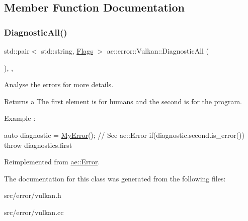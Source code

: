 \subsection{Member Function Documentation}
\hypertarget{classae_1_1error_1_1_vulkan_a1446494fd8ab1b5fc4b9ca8c27b37e8a}{}\label{classae_1_1error_1_1_vulkan_a1446494fd8ab1b5fc4b9ca8c27b37e8a} 
\subsubsection{\texorpdfstring{Diagnostic\+All()}{DiagnosticAll()}}
{\footnotesize\ttfamily std\+::pair$<$ std\+::string, \hyperlink{structae_1_1error_1_1_flags}{Flags} $>$ ae\+::error\+::\+Vulkan\+::\+Diagnostic\+All (\begin{DoxyParamCaption}{ }\end{DoxyParamCaption})\hspace{0.3cm}{\ttfamily [override]}, {\ttfamily [virtual]}, {\ttfamily [noexcept]}}



Analyse the errors for more details. 

\begin{DoxyReturn}{Returns}
a The first element is for humans and the second is for the program.
\end{DoxyReturn}
Example \+:


\begin{DoxyCode}
\textcolor{keyword}{auto} diagnostic = \hyperlink{class_my_error}{MyError}(); \textcolor{comment}{// See ae::Error}
\textcolor{keywordflow}{if}(diagnostic.second.is\_error())
\textcolor{keywordflow}{throw} diagnostics.first
\end{DoxyCode}
 

Reimplemented from \hyperlink{classae_1_1_error_ab6172fe7f6627dd726223bd4bd923693}{ae\+::\+Error}.



The documentation for this class was generated from the following files\+:\begin{DoxyCompactItemize}
\item 
src/error/vulkan.\+h\item 
src/error/vulkan.\+cc\end{DoxyCompactItemize}
